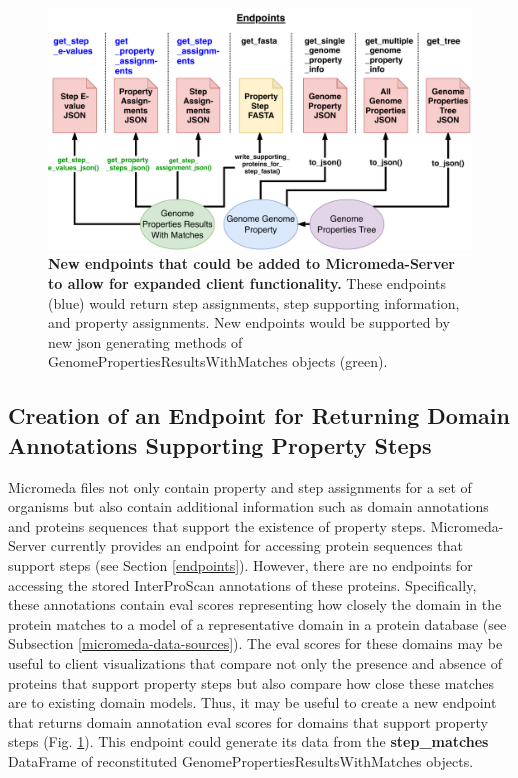 \begin{figure}[!ht]
  \centering
	\includegraphics[width=\textwidth]{media/micromeda-server-new-endpoints.pdf}
	 \caption[New endpoints that could be added to Micromeda-Server to allow for 
expanded client functionality.]{\textbf{New endpoints that could be added to 
Micromeda-Server to allow for expanded client functionality.} These endpoints 
(blue) would return step assignments, step supporting information, and property 
assignments. New endpoints would be supported by new \gls{json} generating 
methods of GenomePropertiesResultsWithMatches objects (green).}
	 \label{fig:new_endpoints}
\end{figure}

\subsection{Creation of an Endpoint for Returning Domain Annotations Supporting 
Property Steps} \label{e-value-endpoint}

Micromeda files not only contain property and step assignments for a set of 
organisms but also contain additional information such as domain annotations and 
proteins sequences that support the existence of property steps. 
Micromeda-Server currently provides an endpoint for accessing protein sequences 
that support steps (see Section \ref{endpoints}). However, there are 
no endpoints for accessing the stored InterProScan annotations of these 
proteins. Specifically, these annotations contain \gls{eval} scores representing 
how closely the domain in the protein matches to a model of a representative 
domain in a protein database (see Subsection \ref{micromeda-data-sources}). The 
\gls{eval} scores for these domains may be useful to client visualizations that 
compare not only the presence and absence of proteins that support property 
steps but also compare how close these matches are to existing domain models. 
Thus, it may be useful to create a new endpoint that returns domain annotation 
\gls{eval} scores for domains that support property steps (Fig. 
\ref{fig:new_endpoints}). This endpoint could generate its data from the 
\textbf{step\_matches} DataFrame of reconstituted 
GenomePropertiesResultsWithMatches objects.


